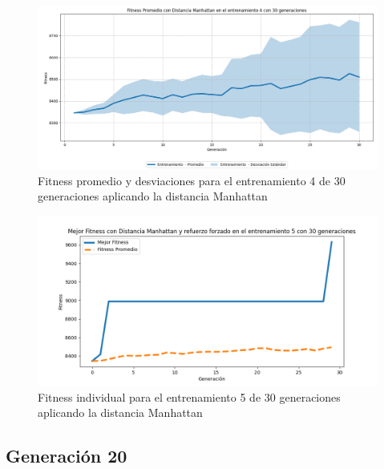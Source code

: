 \documentclass[conference]{IEEEtran}
\begin{document}
\begin{figure}[H]
    \centering
    \includegraphics[width=0.9 \linewidth]{Manhattan/Fitness_individual_30Gen/Fitness_4_Mahn_30Gen_Sombra.png}
    \caption{Fitness promedio y desviaciones para el entrenamiento 4 de 30 generaciones aplicando la distancia Manhattan}
    \label{fig:manhattan_4_30_sombra}
\end{figure}
\begin{figure}[H]
    \centering
    \includegraphics[width=0.9 \linewidth]{Manhattan/Fitness_individual_30Gen/Fitness_5_Mahn_30Gen.png}
    \caption{Fitness individual para el entrenamiento 5 de 30 generaciones aplicando la distancia Manhattan}
    \label{fig:manhattan_5_30}
\end{figure}

\subsection{Generación 20}
\setcounter{figure}{0}
\renewcommand{\thefigure}{S\arabic{figure}C-M}
\end{document}

